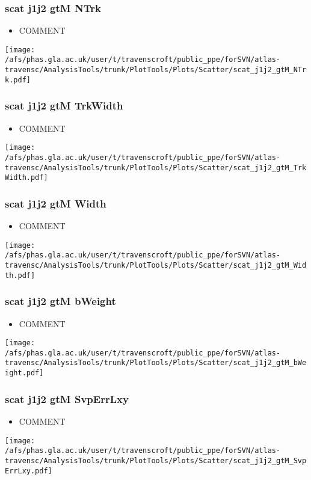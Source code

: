 \documentclass{beamer}
\begin{document}
\begin{frame}
\frametitle{scat j1j2 gtM NTrk}
\begin{itemize}
\item COMMENT
\end{itemize}
\begin{center}
\texttt{[image: /afs/phas.gla.ac.uk/user/t/travenscroft/public\_ppe/forSVN/atlas-travensc/AnalysisTools/trunk/PlotTools/Plots/Scatter/scat\_j1j2\_gtM\_NTrk.pdf]}
\end{center}
\end{frame}

\begin{frame}
\frametitle{scat j1j2 gtM TrkWidth}
\begin{itemize}
\item COMMENT
\end{itemize}
\begin{center}
\texttt{[image: /afs/phas.gla.ac.uk/user/t/travenscroft/public\_ppe/forSVN/atlas-travensc/AnalysisTools/trunk/PlotTools/Plots/Scatter/scat\_j1j2\_gtM\_TrkWidth.pdf]}
\end{center}
\end{frame}

\begin{frame}
\frametitle{scat j1j2 gtM Width}
\begin{itemize}
\item COMMENT
\end{itemize}
\begin{center}
\texttt{[image: /afs/phas.gla.ac.uk/user/t/travenscroft/public\_ppe/forSVN/atlas-travensc/AnalysisTools/trunk/PlotTools/Plots/Scatter/scat\_j1j2\_gtM\_Width.pdf]}
\end{center}
\end{frame}

\begin{frame}
\frametitle{scat j1j2 gtM bWeight}
\begin{itemize}
\item COMMENT
\end{itemize}
\begin{center}
\texttt{[image: /afs/phas.gla.ac.uk/user/t/travenscroft/public\_ppe/forSVN/atlas-travensc/AnalysisTools/trunk/PlotTools/Plots/Scatter/scat\_j1j2\_gtM\_bWeight.pdf]}
\end{center}
\end{frame}

\begin{frame}
\frametitle{scat j1j2 gtM SvpErrLxy}
\begin{itemize}
\item COMMENT
\end{itemize}
\begin{center}
\texttt{[image: /afs/phas.gla.ac.uk/user/t/travenscroft/public\_ppe/forSVN/atlas-travensc/AnalysisTools/trunk/PlotTools/Plots/Scatter/scat\_j1j2\_gtM\_SvpErrLxy.pdf]}
\end{center}
\end{frame}
\end{document}
